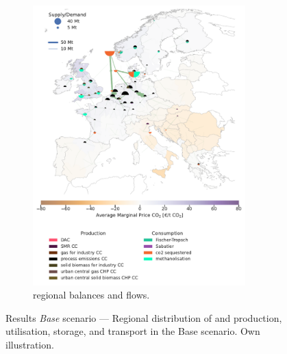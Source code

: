 \documentclass[final,5p,times,twocolumn]{elsarticle}
\begin{document}
\begin{figure}[htbp]
\begin{subfigure}[t]{0.47\textwidth}
      \includegraphics[width=0.9\textwidth]{balance_map_co2_base} %
      \caption{ regional balances and flows.}
      \label{fig:balance_map_co2_base}
  \end{subfigure}
  \caption{Results \textit{Base} scenario --- Regional distribution of  and  production, utilisation, storage, and transport in the Base scenario. Own illustration.}
  \label{fig:balance_maps_base}
\end{figure}
\end{document}
